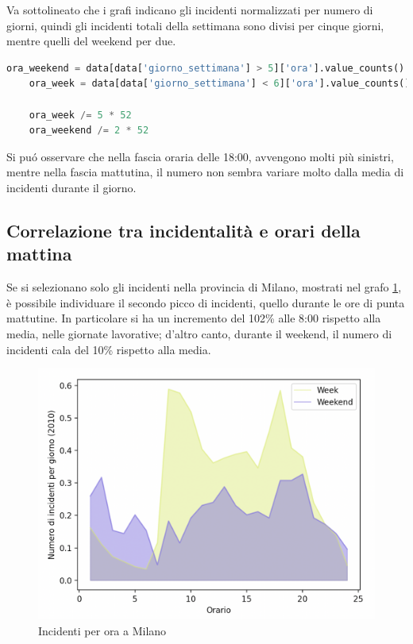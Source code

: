 \documentclass[a4paper]{report}
\begin{document}
Va sottolineato che i grafi indicano gli incidenti normalizzati per numero di 
giorni, quindi gli incidenti totali della settimana sono divisi per cinque giorni, 
mentre quelli del weekend per due.

\begin{lstlisting}[language=Python]
    ora_weekend = data[data['giorno_settimana'] > 5]['ora'].value_counts().sort_index()
    ora_week = data[data['giorno_settimana'] < 6]['ora'].value_counts().sort_index()

    ora_week /= 5 * 52
    ora_weekend /= 2 * 52
\end{lstlisting}

Si pu\'o osservare che nella fascia oraria delle 18:00, 
avvengono molti più sinistri, mentre nella fascia mattutina, 
il numero non sembra variare molto dalla media di incidenti durante il giorno.

\subsection{Correlazione tra incidentalità e orari della mattina}

Se si selezionano solo gli incidenti nella provincia di Milano, mostrati nel grafo 
\ref{fig:week-weekend-milano}, è possibile individuare 
il secondo picco di incidenti, quello durante le ore di punta mattutine.
In particolare si ha un incremento del 102\% alle 8:00 rispetto alla media, nelle giornate lavorative;
d'altro canto, durante il weekend, il numero di incidenti cala del 10\% rispetto alla media.

\begin{figure}
    \includegraphics[width=\linewidth]{../src/incidenti/incidenti_senza_coords/ore_punta/week_weekend_milano.png}
    \caption{Incidenti per ora a Milano}
    \label{fig:week-weekend-milano}
\end{figure}
\end{document}
